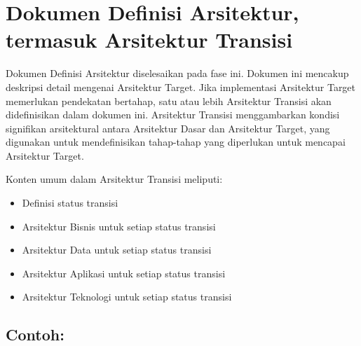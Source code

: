 \section{Dokumen Definisi Arsitektur, termasuk Arsitektur Transisi}

Dokumen Definisi Arsitektur diselesaikan pada fase ini. Dokumen ini mencakup deskripsi detail mengenai Arsitektur Target. Jika implementasi Arsitektur Target memerlukan pendekatan bertahap, satu atau lebih Arsitektur Transisi akan didefinisikan dalam dokumen ini. Arsitektur Transisi menggambarkan kondisi signifikan arsitektural antara Arsitektur Dasar dan Arsitektur Target, yang digunakan untuk mendefinisikan tahap-tahap yang diperlukan untuk mencapai Arsitektur Target.

Konten umum dalam Arsitektur Transisi meliputi:
\begin{itemize}
	\item Definisi status transisi
	\item Arsitektur Bisnis untuk setiap status transisi
	\item Arsitektur Data untuk setiap status transisi
	\item Arsitektur Aplikasi untuk setiap status transisi
	\item Arsitektur Teknologi untuk setiap status transisi
\end{itemize}

\subsection*{Contoh:}

